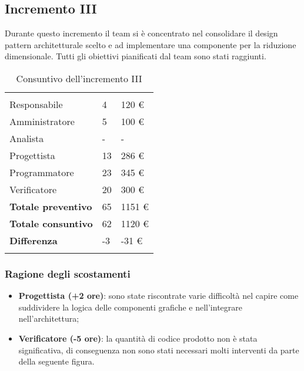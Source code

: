 \subsection{Incremento III}
Durante questo incremento il team si è concentrato nel consolidare il design pattern architetturale scelto e ad implementare una componente per la riduzione dimensionale. Tutti gli obiettivi pianificati dal team sono stati raggiunti.
{
\setlength\arrayrulewidth{1pt}
\begin{longtable}{ C{4cm} C{3cm} C{3.5cm}} 
 	 &
 	 &
 	 \\
 	
 	Responsabile & 4 & 120 € \\
 	Amministratore & 5 & 100 €\\
 	Analista & -& - \\
 	Progettista & 13  & 286 € \\
 	Programmatore & 23 & 345 € \\
 	Verificatore & 20  & 300 € \\
 	
	\hline 	
 	
 	\textbf{Totale preventivo} &
	65 &
 	1151 € \\		
 	
 	\textbf{Totale consuntivo} &
	62 &
 	1120 € \\	
 	
 	\textbf{Differenza} &
	-3 &
 	-31 € \\	
 	
 	\caption{Consuntivo dell'incremento III}
\end{longtable}
}

\subsubsection{Ragione degli scostamenti}


\begin{itemize}
\item \textbf{Progettista (+2 ore)}: sono state riscontrate varie difficoltà nel capire come suddividere la logica delle componenti grafiche e nell'integrare  nell'architettura;
\item \textbf{Verificatore (-5 ore)}: la quantità di codice prodotto non è stata significativa, di conseguenza non sono stati necessari molti interventi da parte della seguente figura.
\end{itemize}

